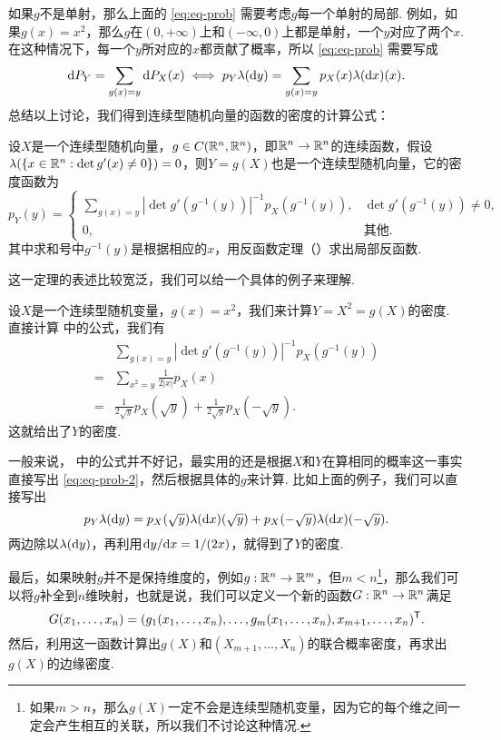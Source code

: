 如果$g$不是单射，那么上面的 \eqref{eq:eq-prob} 需要考虑$g$每一个单射的局部. 例如，如果$g(x)=x^2$，那么$g$在$(0,+\infty)$上和$(-\infty,0)$上都是单射，一个$y$对应了两个$x$. 在这种情况下，每一个$y$所对应的$x$都贡献了概率，所以 \eqref{eq:eq-prob} 需要写成
\begin{equation}
    \mathrm{d} P_Y=\sum_{g(x)=y}\mathrm{d} P_X(x)\iff p_Y\lambda(\mathrm{d} y)=\sum_{g(x)=y}p_X(x)\lambda(\mathrm{d} x)(x).\label{eq:eq-prob-2}
\end{equation}
总结以上讨论，我们得到连续型随机向量的函数的密度的计算公式：

\begin{proposition}\label{prop:continuous-function}
设$X$是一个连续型随机向量，$g\in C(\mathbb{R}^n,\mathbb{R}^n)$，即$\mathbb{R}^n\to\mathbb{R}^n$的连续函数，假设$\lambda(\{x\in\mathbb{R}^n:\det g'(x)\neq 0\})=0$，则$Y=g(X)$也是一个连续型随机向量，它的密度函数为
\[p_Y(y)=\begin{cases}
    \sum_{g(x)=y}|\det g'(g^{-1}(y))|^{-1}p_X(g^{-1}(y)),&\det g'(g^{-1}(y))\neq 0,\\
    0,&\text{其他}.
\end{cases}\]
其中求和号中$g^{-1}(y)$是根据相应的$x$，用反函数定理（）求出局部反函数. 
\end{proposition}

这一定理的表述比较宽泛，我们可以给一个具体的例子来理解. 

\begin{example}
设$X$是一个连续型随机变量，$g(x)=x^2$，我们来计算$Y=X^2=g(X)$的密度. 直接计算 中的公式，我们有
\begin{align*}
    &\sum_{g(x)=y}|\det g'(g^{-1}(y))|^{-1}p_X(g^{-1}(y))\\
    =&\sum_{x^2=y}\frac{1}{2|x|}p_X(x)\\
    =&\frac{1}{2\sqrt{y}}p_X(\sqrt{y})+\frac{1}{2\sqrt{y}}p_X(-\sqrt{y}).
\end{align*}
这就给出了$Y$的密度. 
\end{example}

一般来说， 中的公式并不好记，最实用的还是根据$X$和$Y$在算相同的概率这一事实直接写出 \eqref{eq:eq-prob-2}，然后根据具体的$g$来计算. 比如上面的例子，我们可以直接写出
\[p_Y\lambda(\mathrm{d} y)=p_X(\sqrt{y})\lambda(\mathrm{d} x)(\sqrt{y})+p_X(-\sqrt{y})\lambda(\mathrm{d} x)(-\sqrt{y}).\]
两边除以$\lambda(\mathrm{d} y)$，再利用$\mathrm{d} y/\mathrm{d} x=1/(2x)$，就得到了$Y$的密度. 

最后，如果映射$g$并不是保持维度的，例如$g:\mathbb{R}^n\to\mathbb{R}^m$，但$m<n$\footnote{如果$m>n$，那么$g(X)$一定不会是连续型随机变量，因为它的每个维之间一定会产生相互的关联，所以我们不讨论这种情况. }，那么我们可以将$g$补全到$n$维映射，也就是说，我们可以定义一个新的函数$G:\mathbb{R}^n\to\mathbb{R}^n$满足
\[G(x_1,\dots,x_n)=(g_1(x_1,\dots,x_n),\dots,g_m(x_1,\dots,x_n),x_{m+1},\dots,x_n)^{\mathsf{T}}.\]
然后，利用这一函数计算出$g(X)$和$(X_{m+1},\dots,X_n)$的联合概率密度，再求出$g(X)$的边缘密度. 

